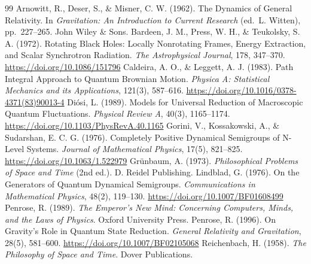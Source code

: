 \documentclass[11pt,a4paper]{article}
\begin{document}
\begin{thebibliography}{99}
\small
{} Arnowitt, R., Deser, S., \& Misner, C. W. (1962). The Dynamics of General Relativity. In \textit{Gravitation: An Introduction to Current Research} (ed.\ L. Witten), pp.\ 227--265. John Wiley \& Sons.
 Bardeen, J. M., Press, W. H., \& Teukolsky, S. A. (1972). Rotating Black Holes: Locally Nonrotating Frames, Energy Extraction, and Scalar Synchrotron Radiation. \textit{The Astrophysical Journal}, 178, 347--370. \url{https://doi.org/10.1086/151796}
 Caldeira, A. O., \& Leggett, A. J. (1983). Path Integral Approach to Quantum Brownian Motion. \textit{Physica A: Statistical Mechanics and its Applications}, 121(3), 587--616. \url{https://doi.org/10.1016/0378-4371(83)90013-4}
 Di\'osi, L. (1989). Models for Universal Reduction of Macroscopic Quantum Fluctuations. \textit{Physical Review A}, 40(3), 1165--1174. \url{https://doi.org/10.1103/PhysRevA.40.1165}
 Gorini, V., Kossakowski, A., \& Sudarshan, E. C. G. (1976). Completely Positive Dynamical Semigroups of N-Level Systems. \textit{Journal of Mathematical Physics}, 17(5), 821--825. \url{https://doi.org/10.1063/1.522979}
 Gr\"unbaum, A. (1973). \textit{Philosophical Problems of Space and Time} (2nd ed.). D. Reidel Publishing.
 Lindblad, G. (1976). On the Generators of Quantum Dynamical Semigroups. \textit{Communications in Mathematical Physics}, 48(2), 119--130. \url{https://doi.org/10.1007/BF01608499}
 Penrose, R. (1989). \textit{The Emperor's New Mind: Concerning Computers, Minds, and the Laws of Physics}. Oxford University Press.
 Penrose, R. (1996). On Gravity's Role in Quantum State Reduction. \textit{General Relativity and Gravitation}, 28(5), 581--600. \url{https://doi.org/10.1007/BF02105068}
 Reichenbach, H. (1958). \textit{The Philosophy of Space and Time}. Dover Publications.
\end{thebibliography}
\end{document}
